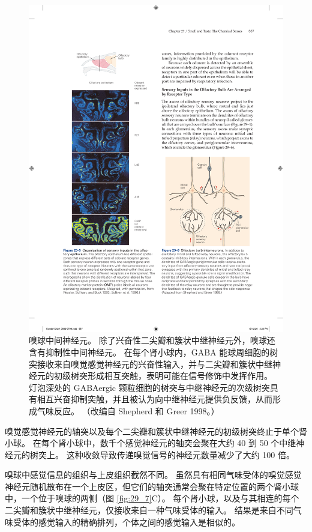 \begin{figure}[htbp]
	\centering
	\includegraphics[width=0.5\linewidth]{chap29/fig_29_6}
	\caption{嗅球中间神经元。 除了兴奋性二尖瓣和簇状中继神经元外，嗅球还含有抑制性中间神经元。 在每个肾小球内，GABA 能球周细胞的树突接收来自嗅觉感觉神经元的兴奋性输入，并与二尖瓣和簇状中继神经元的初级树突形成相互突触，表明可能在信号修饰中发挥作用。 灯泡深处的 GABAergic 颗粒细胞的树突与中继神经元的次级树突具有相互兴奋抑制突触，并且被认为向中继神经元提供负反馈，从而形成气味反应。 （改编自 Shepherd 和 Greer 1998。）}
	\label{fig:29_6}
\end{figure}



嗅觉感觉神经元的轴突以及每个二尖瓣和簇状中继神经元的初级树突终止于单个肾小球。 在每个肾小球中，数千个感觉神经元的轴突会聚在大约 40 到 50 个中继神经元的树突上。 这种收敛导致传递嗅觉信号的神经元数量减少了大约 100 倍。

嗅球中感觉信息的组织与上皮组织截然不同。 
虽然具有相同气味受体的嗅觉感觉神经元随机散布在一个上皮区，但它们的轴突通常会聚在特定位置的两个肾小球中，一个位于嗅球的两侧（图 \ref{fig:29_7}C）。 
每个肾小球，以及与其相连的每个二尖瓣和簇状中继神经元，仅接收来自一种气味受体的输入。 
结果是来自不同气味受体的感觉输入的精确排列，个体之间的感觉输入是相似的。

